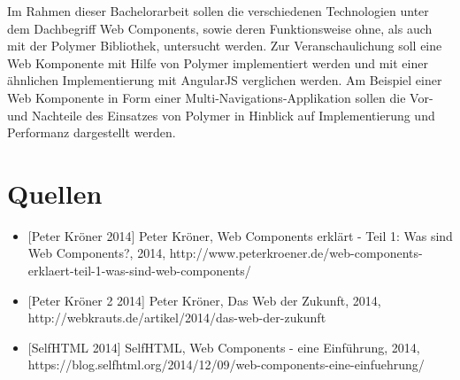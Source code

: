 Im Rahmen dieser Bachelorarbeit sollen die verschiedenen Technologien
unter dem Dachbegriff Web Components, sowie deren Funktionsweise ohne,
als auch mit der Polymer Bibliothek, untersucht werden. Zur
Veranschaulichung soll eine Web Komponente mit Hilfe von Polymer
implementiert werden und mit einer ähnlichen Implementierung mit
AngularJS verglichen werden. Am Beispiel einer Web Komponente in Form
einer Multi-Navigations-Applikation sollen die Vor- und Nachteile des
Einsatzes von Polymer in Hinblick auf Implementierung und Performanz
dargestellt werden.

\section{Quellen}\label{quellen}

\begin{itemize}
\item
  {[}Peter Kröner 2014{]} Peter Kröner, Web Components erklärt - Teil 1:
  Was sind Web Components?, 2014,
  http://www.peterkroener.de/web-components-erklaert-teil-1-was-sind-web-components/
\item
  {[}Peter Kröner 2 2014{]} Peter Kröner, Das Web der Zukunft, 2014,
  http://webkrauts.de/artikel/2014/das-web-der-zukunft
\item
  {[}SelfHTML 2014{]} SelfHTML, Web Components - eine Einführung, 2014,
  https://blog.selfhtml.org/2014/12/09/web-components-eine-einfuehrung/
\end{itemize}
